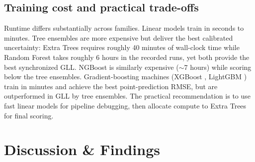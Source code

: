 \documentclass[12pt]{article}
\begin{document}
\subsection{Training cost and practical trade-offs}

Runtime differs substantially across families. Linear models train in seconds to minutes. Tree ensembles are more expensive but deliver the best calibrated uncertainty: Extra Trees requires roughly 40 minutes of wall-clock time while Random Forest takes roughly 6 hours in the recorded runs, yet both provide the best synchronized GLL. NGBoost is similarly expensive ($\sim$7 hours) while scoring below the tree ensembles. Gradient-boosting machines (XGBoost \cite{chen2016}, LightGBM \cite{ke2017}) train in minutes and achieve the best point-prediction RMSE, but are outperformed in GLL by tree ensembles. The practical recommendation is to use fast linear models for pipeline debugging, then allocate compute to Extra Trees for final scoring.


\section{Discussion \& Findings}
\end{document}
